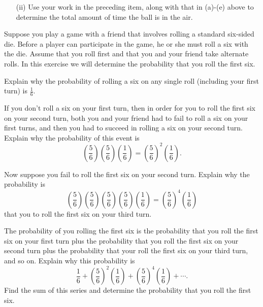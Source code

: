 \begin{exercises}
\begin{itemize}
    \item[(ii)] Use your work in the preceding item, along with that in (a)-(e) above to determine the total amount of time the ball is in the air.

    \end{itemize}

\ea


\item Suppose you play a game with a friend that involves rolling a standard six-sided die. Before a player can participate in the game, he or she must roll a six with the die. Assume that you roll first and that you and your friend take alternate rolls. In this exercise we will determine the probability that you roll the first six. 
    \ba
    \item Explain why the probability of rolling a six on any single roll (including your first turn) is $\frac{1}{6}$. 
    
    \item If you don't roll a six on your first turn, then in order for you to roll the first six on your second turn, both you and your friend had to fail to roll a six on your first turns, and then you had to succeed in rolling a six on your second turn. Explain why the probability of this event is 
        \[\left(\frac{5}{6}\right)\left(\frac{5}{6}\right)\left(\frac{1}{6}\right) = \left(\frac{5}{6}\right)^2\left(\frac{1}{6}\right).\]
                
    \item Now suppose you fail to roll the first six on your second turn. Explain why the probability is 
        \[\left(\frac{5}{6}\right)\left(\frac{5}{6}\right)\left(\frac{5}{6}\right)\left(\frac{5}{6}\right)\left(\frac{1}{6}\right) = \left(\frac{5}{6}\right)^4\left(\frac{1}{6}\right)\]
        that you to roll the first six on your third turn. 
        
    \item The probability of you rolling the first six is the probability that you roll the first six on your first turn plus the probability that you roll the first six on your second turn plus the probability that your roll the first six on your third turn, and so on. Explain why this probability is 
        \[\frac{1}{6} + \left(\frac{5}{6}\right)^2\left(\frac{1}{6}\right) +  \left(\frac{5}{6}\right)^4\left(\frac{1}{6}\right) + \cdots.\]
        Find the sum of this series and determine the probability that you roll the first six. 
        
    \ea


\end{exercises}
